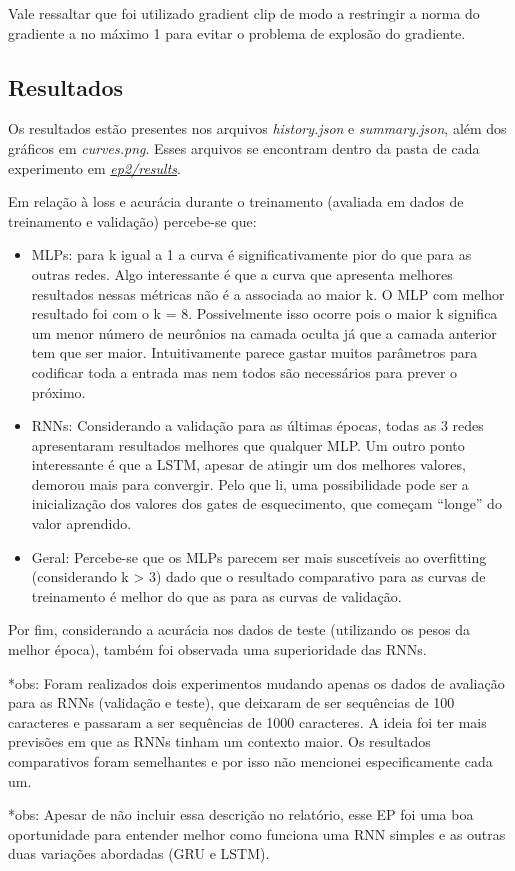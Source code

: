 \documentclass[11pt,a4paper]{article}
\begin{document}
Vale ressaltar que foi utilizado gradient clip de modo a restringir a norma do gradiente a no máximo 1 para evitar o problema de explosão do gradiente.

\subsection{Resultados}

Os resultados estão presentes nos arquivos \textit{history.json} e \textit{summary.json}, além dos gráficos em \textit{curves.png}. Esses arquivos se encontram dentro da pasta de cada experimento em \href{https://github.com/deconr/MAC5921-DeepLearning/tree/main/ep2/results/}{\textit{ep2/results}}.

Em relação à loss e acurácia durante o treinamento (avaliada em dados de treinamento e validação) percebe-se que:

\begin{itemize}
    \item MLPs: para k igual a 1 a curva é significativamente pior do que para as outras redes. Algo interessante é que a curva que apresenta melhores resultados nessas métricas não é a associada ao maior k. O MLP com melhor resultado foi com o k = 8. Possivelmente isso ocorre pois o maior k significa um menor número de neurônios na camada oculta já que a camada anterior tem que ser maior. Intuitivamente parece gastar muitos parâmetros para codificar toda a entrada mas nem todos são necessários para prever o próximo.
    \item RNNs: Considerando a validação para as últimas épocas, todas as 3 redes apresentaram resultados melhores que qualquer MLP. Um outro ponto interessante é que a LSTM, apesar de atingir um dos melhores valores, demorou mais para convergir. Pelo que li, uma possibilidade pode ser a inicialização dos valores dos gates de esquecimento, que começam ``longe'' do valor aprendido.
    \item Geral: Percebe-se que os MLPs parecem ser mais suscetíveis ao overfitting (considerando k > 3) dado que o resultado comparativo para as curvas de treinamento é melhor do que as para as curvas de validação. 
\end{itemize}

Por fim, considerando a acurácia nos dados de teste (utilizando os pesos da melhor época), também foi observada uma superioridade das RNNs. \newline

*obs: Foram realizados dois experimentos mudando apenas os dados de avaliação para as RNNs (validação e teste), que deixaram de ser sequências de 100 caracteres e passaram a ser sequências de 1000 caracteres. A ideia foi ter mais previsões em que as RNNs tinham um contexto maior. Os resultados comparativos foram semelhantes e por isso não mencionei especificamente cada um.

*obs: Apesar de não incluir essa descrição no relatório, esse EP foi uma boa oportunidade para entender melhor como funciona uma RNN simples e as outras duas variações abordadas (GRU e LSTM). 
\end{document}
